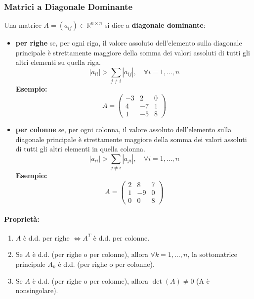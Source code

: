\subsubsection{Matrici a Diagonale Dominante}
\begin{definition}
    Una matrice $A=(a_{ij}) \in \mathbb{R}^{n \times n}$ si dice a \textbf{diagonale dominante}:
    \begin{itemize}
        \item \textbf{per righe} se, per ogni riga, il valore assoluto dell'elemento sulla diagonale principale è strettamente maggiore della somma dei valori assoluti di tutti gli altri elementi su quella riga.
        \[ |a_{ii}| > \sum_{j \neq i} |a_{ij}|, \quad \forall i=1, \dots, n \]
        \textbf{Esempio:}
        \[ A = \begin{pmatrix} -3 & 2 & 0 \\ 4 & -7 & 1 \\ 1 & -5 & 8 \end{pmatrix} \]
        
        \item \textbf{per colonne} se, per ogni colonna, il valore assoluto dell'elemento sulla diagonale principale è strettamente maggiore della somma dei valori assoluti di tutti gli altri elementi in quella colonna.
        \[ |a_{ii}| > \sum_{j \neq i} |a_{ji}|, \quad \forall i=1, \dots, n \]
        \textbf{Esempio:}
        \[ A = \begin{pmatrix} 2 & 8 & 7 \\ 1 & -9 & 0 \\ 0 & 0 & 8 \end{pmatrix} \]
       
    \end{itemize}
    \end{definition}

\paragraph{Proprietà:}
\begin{enumerate}
    \item $A$ è d.d. per righe $\iff A^T$ è d.d. per colonne.
    \item Se $A$ è d.d. (per righe o per colonne), allora $\forall k=1, \dots, n$, la sottomatrice principale $A_k$ è d.d. (per righe o per colonne).
    \item Se $A$ è d.d. (per righe o per colonne), allora $\det(A) \neq 0$ (A è nonsingolare).
\end{enumerate}


